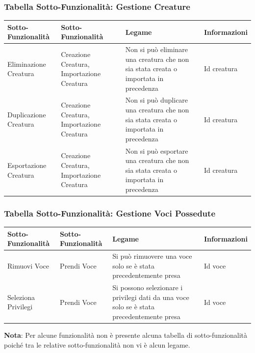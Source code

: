 \documentclass[a4paper, 11pt]{article}
\begin{document}
\vspace{2em}

\subsubsection*{Tabella Sotto-Funzionalità: Gestione Creature}
\begin{adjustwidth}{-1cm}{-1cm}
\begin{center}
    \begin{tabular}{|p{4cm}|p{4cm}|p{4cm}|p{2.5cm}|}
        \hline
        \textbf{Sotto-Funzionalità} & \textbf{Sotto-Funzionalità} & \textbf{Legame} & \textbf{Informazioni} \\\hline
        Eliminazione Creatura & Creazione Creatura, Importazione Creatura & Non si può eliminare una creatura che non sia stata creata o importata in precedenza & Id creatura \\\hline
        Duplicazione Creatura & Creazione Creatura, Importazione Creatura & Non si può duplicare una creatura che non sia stata creata o importata in precedenza & Id creatura \\\hline
        Esportazione Creatura & Creazione Creatura, Importazione Creatura & Non si può esportare una creatura che non sia stata creata o importata in precedenza & Id creatura \\\hline
    \end{tabular}
\end{center}
\end{adjustwidth}

\vspace{2em}

\subsubsection*{Tabella Sotto-Funzionalità: Gestione Voci Possedute}
\begin{adjustwidth}{-1cm}{-1cm}
\begin{center}
    \begin{tabular}{|p{4cm}|p{4cm}|p{4cm}|p{2.5cm}|}
        \hline
        \textbf{Sotto-Funzionalità} & \textbf{Sotto-Funzionalità} & \textbf{Legame} & \textbf{Informazioni} \\\hline
        Rimuovi Voce & Prendi Voce & Si può rimuovere una voce solo se è stata precedentemente presa & Id voce \\\hline
        Seleziona Privilegi & Prendi Voce & Si possono selezionare i privilegi dati da una voce solo se è stata precedentemente presa & Id voce \\\hline
    \end{tabular}
\end{center}
\end{adjustwidth}
\vspace{1em}
\textbf{Nota}: Per alcune funzionalità non è presente alcuna tabella di sotto-funzionalità poiché tra le relative sotto-funzionalità non vi è alcun legame.
\end{document}
